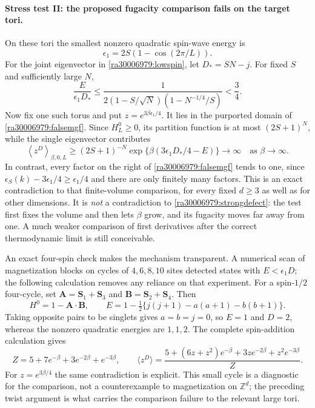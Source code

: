 \documentclass[11pt]{article}
\newcommand{\Z}{\mathbb{Z}}
\begin{document}
	\paragraph{Stress test II: the proposed fugacity comparison fails on the target tori.}
	On these tori the smallest nonzero quadratic spin-wave energy is
	\[
	\epsilon_1=2S(1-\cos(2\pi/L)).
	\]
	For the joint eigenvector in \eqref{ra30006979:lowspin}, let $D_*=SN-j$.
	For fixed $S$ and sufficiently large $N$,
	\begin{equation}\label{ra30006979:halfgap}
		\frac{E}{\epsilon_1D_*}
		\leq\frac{1}
		{2(1-S/\sqrt N)(1-N^{-1/4}/S)}<\frac34.
	\end{equation}
	Now fix one such torus and put $z=e^{3\beta\epsilon_1/4}$.
	It lies in the purported domain of \eqref{ra30006979:falsemgf}. Since
	$H_L^0\geq0$, its partition function is at most $(2S+1)^N$, while the
	single eigenvector contributes
	\[
	\left\langle z^D\right\rangle_{\beta,0,L}
	\geq (2S+1)^{-N}
	\exp\{\beta(3\epsilon_1D_*/4-E)\}
	\longrightarrow\infty
	\quad\text{as }\beta\to\infty.
	\]
	In contrast, every factor on the right of \eqref{ra30006979:falsemgf} tends
	to one, since $\epsilon_S(k)-3\epsilon_1/4\geq\epsilon_1/4$ and
	there are only finitely many factors. This is an exact contradiction
	to that finite-volume comparison, for every fixed $d\geq3$ as well as
	for other dimensions. It is \emph{not} a contradiction to
	\eqref{ra30006979:strongdefect}: the test first fixes the volume and then
	lets $\beta$ grow, and its fugacity moves far away from one.
	A much weaker comparison of first derivatives after the correct
	thermodynamic limit is still conceivable.
	
	An exact four-spin check makes the mechanism transparent. A numerical
	scan of magnetization blocks on cycles of $4,6,8,10$ sites detected
	states with $E<\epsilon_1D$; the following calculation
	removes any reliance on that experiment. For a spin-$1/2$ four-cycle,
	set $\mathbf A=\mathbf S_1+\mathbf S_3$ and
	$\mathbf B=\mathbf S_2+\mathbf S_4$. Then
	\[
	H^0=1-\mathbf A\cdot\mathbf B,
	\qquad E=1-\tfrac12\{j(j+1)-a(a+1)-b(b+1)\}.
	\]
	Taking opposite pairs to be singlets gives $a=b=j=0$, so $E=1$ and
	$D=2$, whereas the nonzero quadratic energies are $1,1,2$. The complete
	spin-addition calculation gives
	\[
	Z=5+7e^{-\beta}+3e^{-2\beta}+e^{-3\beta},\qquad
	\langle z^D\rangle=
	\frac{5+(6z+z^2)e^{-\beta}+3ze^{-2\beta}+z^2e^{-3\beta}}{Z}.
	\]
	For $z=e^{3\beta/4}$ the same contradiction is explicit. This small
	cycle is a diagnostic for the comparison, not a counterexample to
	magnetization on $\Z^d$; the preceding twist argument is what carries
	the comparison failure to the relevant large tori.
	
\end{document}
